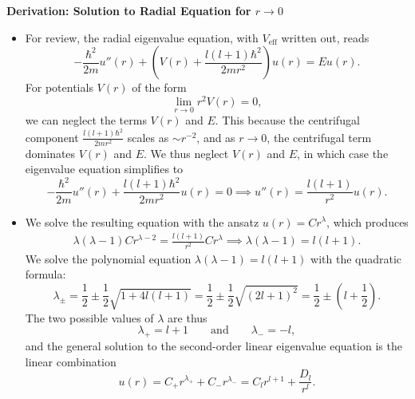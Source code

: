 \documentclass[11pt, a4paper]{article}
\newcommand{\eqtext}[1]{\qquad \text{#1} \qquad}
\begin{document}
\textbf{Derivation: Solution to Radial Equation for $ r \to 0 $}
\begin{itemize}

    \item For review, the radial eigenvalue equation, with $ V_{\text{eff}} $ written out, reads
    \begin{equation*}
        - \frac{\hbar^{2}}{2m}u''(r) + \left( V(r) + \frac{l (l + 1) \hbar^{2} }{2mr^{2}} \right)u(r) = Eu(r).
    \end{equation*}
    For potentials $ V(r) $ of the form
	\begin{equation*}
		\lim_{r \to 0}r^{2}V(r) = 0,
	\end{equation*}
    we can neglect the terms $ V(r) $ and $ E $. This because the centrifugal component $ \frac{l (l+1)\hbar^{2}}{2mr^{2}} $ scales as $ \sim r^{-2} $, and as $ r \to 0 $, the centrifugal term dominates $ V(r) $ and $ E $. We thus neglect $ V(r) $ and $ E $, in which case the eigenvalue equation simplifies to
	\begin{equation*}
		-\frac{\hbar^{2}}{2m}u''(r) + \frac{l (l+1)\hbar^{2}}{2mr^{2}}u(r) = 0 \implies u''(r) = \frac{l (l+1)}{r^{2}}u(r).
	\end{equation*}

	\item We solve the resulting equation with the ansatz $ u(r) = Cr^{\lambda} $, which produces
	\begin{align*}
		\lambda (\lambda - 1)Cr^{\lambda-2} = \frac{l (l+1)}{r^{2}}Cr^{\lambda} \implies 	\lambda (\lambda - 1) = l (l+1).
	\end{align*}
	We solve the polynomial equation $ \lambda (\lambda - 1) = l (l+1) $ with the quadratic formula:
	\begin{equation*}
		\lambda_{\pm} = \frac{1}{2} \pm \frac{1}{2}\sqrt{1 + 4l (l+1)} = \frac{1}{2} \pm \frac{1}{2}\sqrt{(2l+1)^{2}}  = \frac{1}{2} \pm \left(l + \frac{1}{2}\right).
	\end{equation*}
	The two possible values of $ \lambda $ are thus
	\begin{equation*}
		\lambda_{+} = l + 1 \eqtext{and} \lambda_{-} = -l,
	\end{equation*}
	and the general solution to the second-order linear eigenvalue equation is the linear combination
	\begin{equation*}
		u(r) = C_{+}r^{\lambda_{+}} + C_{-}r^{\lambda_{-}} = C_{l}r^{l+1} + \frac{D_{l}}{r^{l}}.
	\end{equation*}
	

\end{itemize}
\end{document}
